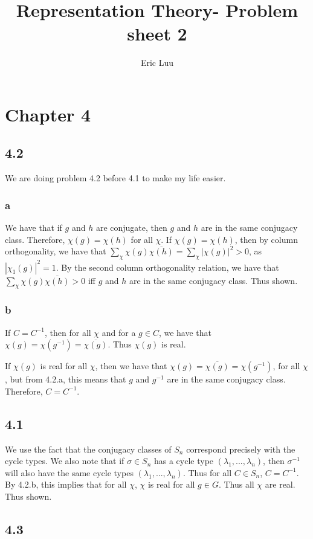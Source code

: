 \documentclass[]{article}
\title{Representation Theory- Problem sheet 2}
\author{Eric Luu}
\begin{document}
\maketitle

\section*{Chapter 4}
\subsection*{4.2}
We are doing problem 4.2 before 4.1 to make my life easier.

\subsubsection*{a}
We have that if $g$ and $h$ are conjugate, then $g$ and $h$ are in the same conjugacy class. Therefore, $\chi(g) = \chi(h)$ for all $\chi$. If $\chi(g) = \chi(h)$, then by column orthogonality, we have that $\sum_\chi \chi(g) \overline{\chi(h)} = \sum_\chi |\chi(g)|^2 > 0$, as $|\chi_1(g)|^2 = 1$. By the second column orthogonality relation, we have that $\sum_\chi \chi(g) \overline{\chi(h)} > 0$ iff $g$ and $h$ are in the same conjugacy class. Thus shown.
\subsubsection*{b}
If $C = C^{-1}$, then for all $\chi$ and for a $g \in C$, we have that $\chi(g) = \chi(g^{-1}) = \overline{\chi(g)}$. Thus $\chi(g)$ is real. 

If $\chi(g)$ is real for all $\chi$, then we have that $\chi(g) = \overline{\chi(g)} = \chi(g^{-1})$, for all $\chi$, but from 4.2.a, this means that $g$ and $g^{-1}$ are in the same conjugacy class. Therefore, $C = C^{-1}$. 

\subsection*{4.1}
We use the fact that the conjugacy classes of $S_n$ correspond precisely with the cycle types. We also note that if $\sigma \in S_n$ has a cycle type $(\lambda_1, ..., \lambda_n)$, then $\sigma^{-1}$ will also have the same cycle types $(\lambda_1, ..., \lambda_n)$. Thus for all $C \in S_n$, $C = C^{-1}$. By 4.2.b, this implies that for all $\chi$, $\chi$ is real for all $g \in G$. Thus all $\chi$ are real. Thus shown. 

\subsection*{4.3}
\end{document}
